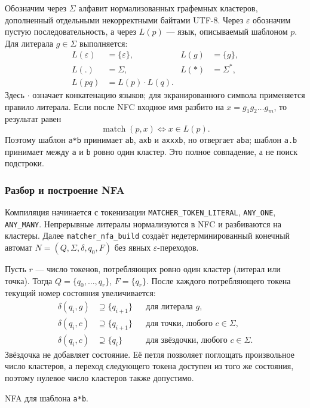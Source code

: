 \documentclass[12pt,a4paper]{article}
\begin{document}
Обозначим через $\Sigma$ алфавит нормализованных графемных кластеров,
дополненный отдельными некорректными байтами UTF-8. Через $\varepsilon$
обозначим пустую последовательность, а через $L(p)$ --- язык,
описываемый шаблоном $p$. Для литерала $g\in\Sigma$ выполняется:
\begin{align*}
 L(\varepsilon)&=\{\varepsilon\}, &
 L(g)&=\{g\}, \\
 L(\texttt{.})&=\Sigma, &
 L(\texttt{*})&=\Sigma^{*}, \\
 L(pq)&=L(p)\cdot L(q).
\end{align*}
Здесь $\cdot$ означает конкатенацию языков; для экранированного символа
применяется правило литерала. Если после NFC входное имя разбито на
$x=g_1g_2\ldots g_m$, то результат равен
\[
 \operatorname{match}(p,x)\iff x\in L(p).
\]
Поэтому шаблон \texttt{a*b} принимает \texttt{ab}, \texttt{axb} и
\texttt{axxxb}, но отвергает \texttt{aba}; шаблон \texttt{a.b}
принимает между \texttt{a} и \texttt{b} ровно один кластер.
Это полное совпадение, а не поиск подстроки.

\subsubsection{Разбор и построение NFA}

Компиляция начинается с токенизации
\texttt{MATCHER\_TOKEN\_LITERAL}, \texttt{ANY\_ONE},
\texttt{ANY\_MANY}. Непрерывные литералы нормализуются в NFC и
разбиваются на кластеры. Далее \texttt{matcher\_nfa\_build}
создаёт недетерминированный конечный автомат
$N=(Q,\Sigma,\delta,q_0,F)$ без явных $\varepsilon$-переходов.

Пусть $r$ --- число токенов, потребляющих ровно один кластер
(литерал или точка). Тогда
$Q=\{q_0,\ldots,q_r\}$, $F=\{q_r\}$.
После каждого потребляющего токена текущий номер состояния увеличивается:
\begin{align*}
 \delta(q_i,g)&\supseteq\{q_{i+1}\}
 &&\text{для литерала }g,\\
 \delta(q_i,c)&\supseteq\{q_{i+1}\}
 &&\text{для точки, любого }c\in\Sigma,\\
 \delta(q_i,c)&\supseteq\{q_i\}
 &&\text{для звёздочки, любого }c\in\Sigma.
\end{align*}
Звёздочка не добавляет состояние. Её петля позволяет поглощать
произвольное число кластеров, а переход следующего токена доступен
из того же состояния, поэтому нулевое число кластеров также допустимо.

\begin{center}
\end{center}
\begin{center}\small NFA для шаблона \texttt{a*b}.\end{center}
\end{document}
